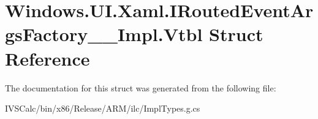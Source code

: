 \hypertarget{struct_windows_1_1_u_i_1_1_xaml_1_1_i_routed_event_args_factory_____impl_1_1_vtbl}{}\section{Windows.\+U\+I.\+Xaml.\+I\+Routed\+Event\+Args\+Factory\+\_\+\+\_\+\+Impl.\+Vtbl Struct Reference}
\label{struct_windows_1_1_u_i_1_1_xaml_1_1_i_routed_event_args_factory_____impl_1_1_vtbl}


The documentation for this struct was generated from the following file\+:\begin{DoxyCompactItemize}
\item 
I\+V\+S\+Calc/bin/x86/\+Release/\+A\+R\+M/ilc/Impl\+Types.\+g.\+cs\end{DoxyCompactItemize}
